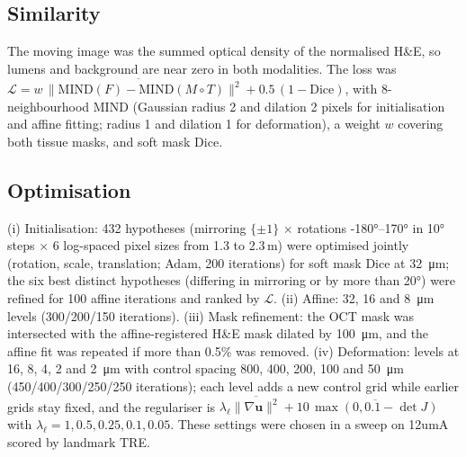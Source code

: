 \documentclass[9pt,twocolumn]{extarticle}
\begin{document}
\subsection{Similarity} The moving image was the summed optical density of the normalised H\&E, so lumens and background are near zero in both modalities. The loss was $\mathcal{L}=\overline{w\,\|\mathrm{MIND}(F)-\mathrm{MIND}(M\circ T)\|^2}+0.5\,(1-\mathrm{Dice})$, with 8-neighbourhood MIND\cite{heinrich2012} (Gaussian radius 2 and dilation 2 pixels for initialisation and affine fitting; radius 1 and dilation 1 for deformation), a weight $w$ covering both tissue masks, and soft mask Dice.

\subsection{Optimisation} (i) Initialisation: 432 hypotheses (mirroring $\{\pm1\}$ $\times$ rotations \ang{-180}--\ang{170} in \ang{10} steps $\times$ 6 log-spaced pixel sizes from 1.3 to 2.3\,\textmu m) were optimised jointly (rotation, scale, translation; Adam, 200 iterations) for soft mask Dice at \SI{32}{\micro\metre}; the six best distinct hypotheses (differing in mirroring or by more than \ang{20}) were refined for 100 affine iterations and ranked by $\mathcal{L}$. (ii) Affine: \SI{32}{}, \SI{16}{} and \SI{8}{\micro\metre} levels (300/200/150 iterations). (iii) Mask refinement: the OCT mask was intersected with the affine-registered H\&E mask dilated by \SI{100}{\micro\metre}, and the affine fit was repeated if more than 0.5\% was removed. (iv) Deformation: levels at \SI{16}{}, \SI{8}{}, \SI{4}{}, \SI{2}{} and \SI{2}{\micro\metre} with control spacing \SI{800}{}, \SI{400}{}, \SI{200}{}, \SI{100}{} and \SI{50}{\micro\metre} (450/400/300/250/250 iterations); each level adds a new control grid while earlier grids stay fixed, and the regulariser is $\lambda_\ell\overline{\|\nabla\mathbf{u}\|^2}+10\,\overline{\max(0,0.1-\det J)}$ with $\lambda_\ell=1,0.5,0.25,0.1,0.05$. These settings were chosen in a sweep on 12umA scored by landmark TRE.
\end{document}
